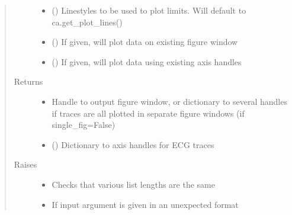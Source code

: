 \documentclass[letterpaper,10pt,english]{sphinxmanual}
\begin{document}
\begin{fulllineitems}
\begin{quote}
\begin{description}
\begin{itemize}
\item {} 
\sphinxAtStartPar
{} (\sphinxstyleliteralemphasis{\sphinxupquote{, }}) \textendash{} Linestyles to be used to plot limits. Will default to ca.get\_plot\_lines()

\item {} 
\sphinxAtStartPar
{} () \textendash{} If given, will plot data on existing figure window

\item {} 
\sphinxAtStartPar
{} () \textendash{} If given, will plot data using existing axis handles

\end{itemize}

\item[{Returns}] \leavevmode
\sphinxAtStartPar
\begin{itemize}
\item {} 
\sphinxAtStartPar
{} \textendash{} Handle to output figure window, or dictionary to several handles if traces are all plotted in separate figure
windows (if single\_fig=False)

\item {} 
\sphinxAtStartPar
{} () \textendash{} Dictionary to axis handles for ECG traces

\end{itemize}


\item[{Raises}] \leavevmode\begin{itemize}
\item {} 
\sphinxAtStartPar
{} \textendash{} Checks that various list lengths are the same

\item {} 
\sphinxAtStartPar
{} \textendash{} If input argument is given in an unexpected format

\end{itemize}

\end{description}\end{quote}

\end{fulllineitems}
\end{document}
